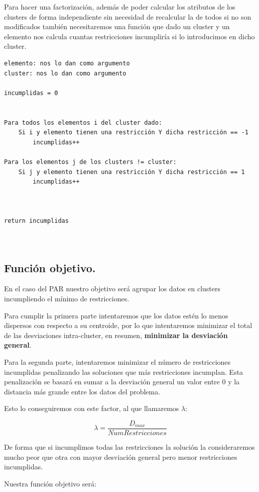 \documentclass[12pt, spanish]{article}
\begin{document}
Para hacer una factorización, además de poder calcular los atributos de los clusters de forma independiente sin necesidad de recalcular la de todos si no son modificados también necesitaremos una función que dado un cluster y un elemento nos calcula cuantas restricciones incumpliría si lo introducimos en dicho cluster.


\begin{lstlisting}
elemento: nos lo dan como argumento
cluster: nos lo dan como argumento

incumplidas = 0


Para todos los elementos i del cluster dado:
	Si i y elemento tienen una restricción Y dicha restricción == -1
		incumplidas++

Para los elementos j de los clusters != cluster:
	Si j y elemento tienen una restricción Y dicha restricción == 1
		incumplidas++



return incumplidas
	
	
\end{lstlisting}

\subsection{Función objetivo.}

En el caso del PAR nuestro objetivo será agrupar los datos en clusters incumpliendo el mínimo de restricciones.

Para cumplir la primera parte intentaremos que los datos estén lo menos dispersos con respecto a su centroide, por lo que intentaremos minimizar el total de las desviaciones intra-cluster, en resumen, \textbf{minimizar la desviación general}. 

Para la segunda parte, intentaremos minimizar el número de restricciones incumplidas penalizando las soluciones que más restricciones incumplan. Esta penalización se basará en sumar a la desviación general un valor entre 0 y la distancia más grande entre los datos del problema.

Esto lo conseguiremos con este factor, al que llamaremos $\lambda$:

$$ \lambda = \frac{D_{max}}{NumRestricciones} $$ 


De forma que si incumplimos todas las restricciones la solución la consideraremos mucho peor que otra con mayor desviación general pero menor restricciones incumplidas.

Nuestra función objetivo será:
\end{document}
